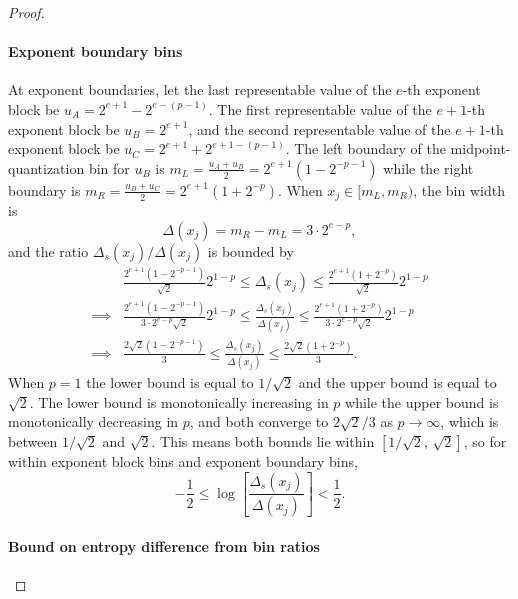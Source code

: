 \documentclass[12pt,onecolumn, margin=1in]{IEEEtran}
\begin{document}
\begin{proof}
\paragraph{Exponent boundary bins}

At exponent boundaries, let the last representable value of the $e$-th exponent block be $u_A = 2^{e+1} - 2^{e-(p-1)}$. The first representable value of the $e+1$-th exponent block be $u_B = 2^{e+1}$, and the second representable value of the $e+1$-th exponent block be $u_C = 2^{e+1} + 2^{e+1 - (p-1)}$. The left boundary of the midpoint-quantization bin for $u_B$ is $m_L = \frac{u_A + u_B}{2} = 2^{e+1}(1 - 2^{-p-1})$ while the right boundary is $m_R = \frac{u_B + u_C}{2} = 2^{e+1}(1+2^{-p})$. When $x_j \in [m_L, m_R)$, the bin width is
\begin{equation}\label{eq:exp_boundary}
\Delta(x_j) = m_R - m_L = 3 \cdot 2^{e-p},
\end{equation}
and the ratio $\Delta_s(x_j)/\Delta(x_j)$ is bounded by
\begin{equation}
    \begin{aligned}
    &\frac{2^{e+1}(1 - 2^{-p-1})}{\sqrt{2}}2^{1-p} \leq \Delta_s(x_j) \leq \frac{2^{e+1}(1+2^{-p})}{\sqrt{2}}2^{1-p}\\
    \implies & \frac{2^{e+1}(1 - 2^{-p-1})}{3 \cdot 2^{e-p}\sqrt{2}}2^{1-p} \leq \frac{\Delta_s(x_j)}{\Delta(x_j)} \leq \frac{2^{e+1}(1+2^{-p})}{3 \cdot 2^{e-p}\sqrt{2}}2^{1-p}\\
    \implies & \frac{2\sqrt{2}(1 - 2^{-p-1})}{3} \leq \frac{\Delta_s(x_j)}{\Delta(x_j)}  \leq \frac{2\sqrt{2}(1+2^{-p})}{3}.
    \end{aligned}
\end{equation}
When $p = 1$ the lower bound is equal to $1/\sqrt{2}$ and the upper bound is equal to $\sqrt{2}$. The lower bound is monotonically increasing in $p$ while the upper bound is monotonically decreasing in $p$, and both converge to $2\sqrt{2}/3$ as $p \rightarrow \infty$, which is between $1/\sqrt{2}$ and $\sqrt{2}$. This means both bounds lie within $[1/\sqrt{2},\, \sqrt{2}]$, so for within exponent block bins and exponent boundary bins,
\begin{equation}
    -\frac{1}{2} \leq \log\left[\frac{\Delta_s(x_j)}{\Delta(x_j)}\right] < \frac{1}{2}.
\end{equation}

\paragraph{Bound on entropy difference from bin ratios}



\end{proof}
\end{document}
